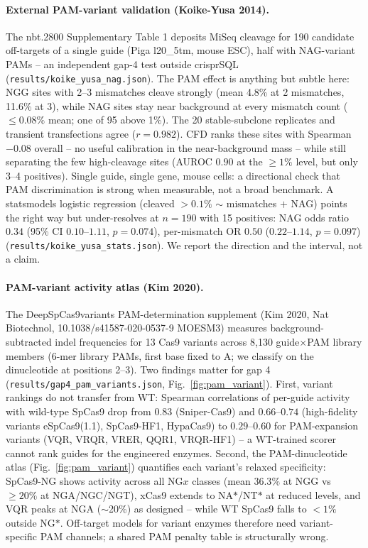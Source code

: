 \documentclass[12pt]{article}
\begin{document}
\paragraph{External PAM-variant validation (Koike-Yusa 2014).} The
nbt.2800 Supplementary Table 1 deposits MiSeq cleavage for 190 candidate
off-targets of a single guide (Piga l20\_5tm, mouse ESC), half with
NAG-variant PAMs -- an independent gap-4 test outside crisprSQL
(\texttt{results/koike\_yusa\_nag.json}). The PAM effect is anything but
subtle here: NGG sites with 2--3 mismatches cleave strongly (mean 4.8\%
at 2 mismatches, 11.6\% at 3), while NAG sites stay near background at
every mismatch count ($\le 0.08\%$ mean; one of 95 above 1\%). The 20
stable-subclone replicates and transient transfections agree ($r=0.982$).
CFD ranks these sites with Spearman $-0.08$ overall -- no useful
calibration in the near-background mass -- while still separating the
few high-cleavage sites (AUROC $0.90$ at the $\ge 1\%$ level, but only
3--4 positives). Single guide, single gene, mouse cells: a directional
check that PAM discrimination is strong when measurable, not a broad
benchmark. A statsmodels logistic regression
(cleaved $>0.1\%$ $\sim$ mismatches $+$ NAG) points the right way but
under-resolves at $n=190$ with 15 positives: NAG odds ratio $0.34$
(95\% CI $0.10$--$1.11$, $p=0.074$), per-mismatch OR $0.50$
($0.22$--$1.14$, $p=0.097$) (\texttt{results/koike\_yusa\_stats.json}).
We report the direction and the interval, not a claim.
\paragraph{PAM-variant activity atlas (Kim 2020).} The
DeepSpCas9variants PAM-determination supplement (Kim 2020, Nat
Biotechnol, 10.1038/s41587-020-0537-9 MOESM3) measures
background-subtracted indel frequencies for 13 Cas9 variants across
8{,}130 guide$\times$PAM library members (6-mer library PAMs, first base
fixed to A; we classify on the dinucleotide at positions 2--3). Two
findings matter for gap 4 (\texttt{results/gap4\_pam\_variants.json},
Fig.~\ref{fig:pam_variant}). First, variant rankings do not transfer
from WT: Spearman correlations of per-guide activity with wild-type
SpCas9 drop from $0.83$ (Sniper-Cas9) and $0.66$--$0.74$ (high-fidelity
variants eSpCas9(1.1), SpCas9-HF1, HypaCas9) to $0.29$--$0.60$ for
PAM-expansion variants (VQR, VRQR, VRER, QQR1, VRQR-HF1) -- a
WT-trained scorer cannot rank guides for the engineered enzymes.
Second, the PAM-dinucleotide atlas (Fig.~\ref{fig:pam_variant})
quantifies each variant's relaxed specificity: SpCas9-NG shows activity
across all NG$x$ classes (mean $36.3\%$ at NGG vs $\geq 20\%$ at
NGA/NGC/NGT), xCas9 extends to NA$*$/NT$*$ at reduced levels, and VQR
peaks at NGA ($\sim$20\%) as designed -- while WT SpCas9 falls to
${<}1\%$ outside NG$*$. Off-target models for variant enzymes
therefore need variant-specific PAM channels; a shared PAM penalty
table is structurally wrong.
\end{document}

